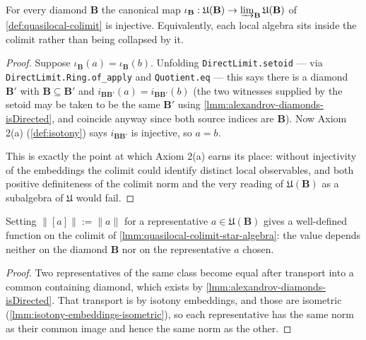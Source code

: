 \begin{lemma}
    \label{lmm:quasilocal-colimit-of-injective}
    For every diamond $\mathbf{B}$ the canonical map $\iota_{\mathbf{B}} : \mathfrak{U}(\mathbf{B}) \to \varinjlim_{\mathbf{B}} \mathfrak{U}(\mathbf{B})$ of \ref{def:quasilocal-colimit} is injective. Equivalently, each local algebra sits inside the colimit rather than being collapsed by it.
\end{lemma}
\begin{proof}
    Suppose $\iota_{\mathbf{B}}(a) = \iota_{\mathbf{B}}(b)$. Unfolding \texttt{DirectLimit.setoid} --- via \texttt{DirectLimit.Ring.of\_apply} and \texttt{Quotient.eq} --- this says there is a diamond $\mathbf{B}'$ with $\mathbf{B} \subseteq \mathbf{B}'$ and $i_{\mathbf{B}\mathbf{B}'}(a) = i_{\mathbf{B}\mathbf{B}'}(b)$ (the two witnesses supplied by the setoid may be taken to be the same $\mathbf{B}'$ using \ref{lmm:alexandrov-diamonds-isDirected}, and coincide anyway since both source indices are $\mathbf{B}$). Now Axiom 2(a) (\ref{def:isotony}) says $i_{\mathbf{B}\mathbf{B}'}$ is injective, so $a = b$.

    This is exactly the point at which Axiom 2(a) earns its place: without injectivity of the embeddings the colimit could identify distinct local observables, and both positive definiteness of the colimit norm and the very reading of $\mathfrak{U}(\mathbf{B})$ as a subalgebra of $\mathfrak{U}$ would fail.
\end{proof}

\begin{lemma}
    \label{lmm:quasilocal-colimit-norm-well-defined}
    Setting $\|[a]\| := \|a\|$ for a representative $a \in \mathfrak{U}(\mathbf{B})$ gives a well-defined function on the colimit of \ref{lmm:quasilocal-colimit-star-algebra}: the value depends neither on the diamond $\mathbf{B}$ nor on the representative $a$ chosen.
\end{lemma}
\begin{proof}
    Two representatives of the same class become equal after transport into a common containing diamond, which exists by \ref{lmm:alexandrov-diamonds-isDirected}. That transport is by isotony embeddings, and those are isometric (\ref{lmm:isotony-embeddings-isometric}), so each representative has the same norm as their common image and hence the same norm as the other.
\end{proof}

